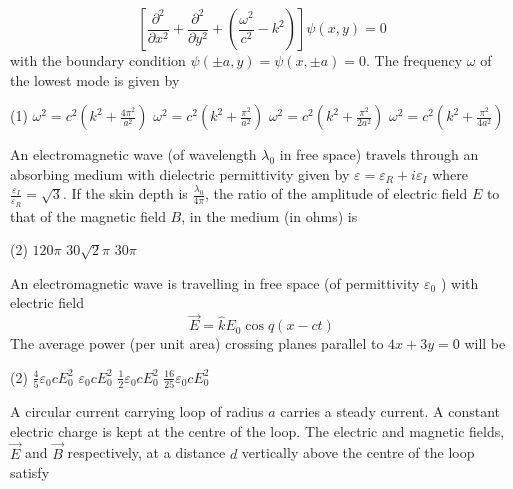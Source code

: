 \begin{enumerate}
\begin{minipage}{\textwidth}
	$$
	\left[\frac{\partial^{2}}{\partial x^{2}}+\frac{\partial^{2}}{\partial y^{2}}+\left(\frac{\omega^{2}}{c^{2}}-k^{2}\right)\right] \psi(x, y)=0
	$$
	with the boundary condition $\psi(\pm a, y)=\psi(x, \pm a)=0$. The frequency $\omega$ of the lowest mode is given by
\end{minipage}
\begin{tasks}(1)
	\task[\textbf{A.}] $\omega^{2}=c^{2}\left(k^{2}+\frac{4 \pi^{2}}{a^{2}}\right)$
	\task[\textbf{B.}]$\omega^{2}=c^{2}\left(k^{2}+\frac{\pi^{2}}{a^{2}}\right)$
	\task[\textbf{C.}]$\omega^{2}=c^{2}\left(k^{2}+\frac{\pi^{2}}{2 a^{2}}\right)$
	\task[\textbf{D.}]$\omega^{2}=c^{2}\left(k^{2}+\frac{\pi^{2}}{4 a^{2}}\right)$
\end{tasks}
\begin{minipage}{\textwidth}
	\item An electromagnetic wave (of wavelength $\lambda_{0}$ in free space) travels through an absorbing medium with dielectric permittivity given by $\varepsilon=\varepsilon_{R}+i \varepsilon_{I}$ where $\frac{\varepsilon_{I}}{\varepsilon_{R}}=\sqrt{3}$. If the skin depth is $\frac{\lambda_{0}}{4 \pi}$, the ratio of the amplitude of electric field $E$ to that of the magnetic field $B$, in the medium (in ohms) is
\end{minipage}
\begin{tasks}(2)
	\task[\textbf{A.}] $120 \pi$
	\task[\textbf{C.}]$30 \sqrt{2} \pi$
	\task[\textbf{D.}] $30 \pi$
\end{tasks}
\begin{minipage}{\textwidth}
	\item An electromagnetic wave is travelling in free space (of permittivity $\varepsilon_{0}$ ) with electric field
	$$
	\vec{E}=\hat{k} E_{0} \cos q(x-c t)
	$$
	The average power (per unit area) crossing planes parallel to $4 x+3 y=0$ will be
\end{minipage}
\begin{tasks}(2)
	\task[\textbf{A.}] $\frac{4}{5} \varepsilon_{0} c E_{0}^{2}$
	\task[\textbf{B.}]$\varepsilon_{0} c E_{0}^{2}$
	\task[\textbf{C.}]$\frac{1}{2} \varepsilon_{0} c E_{0}^{2}$
	\task[\textbf{D.}] $\frac{16}{25} \varepsilon_{0} c E_{0}^{2}$
\end{tasks}
\begin{minipage}{\textwidth}
	\item A circular current carrying loop of radius $a$ carries a steady current. A constant electric charge is kept at the centre of the loop. The electric and magnetic fields, $\vec{E}$ and $\vec{B}$ respectively, at a distance $d$ vertically above the centre of the loop satisfy

\end{minipage}
\end{enumerate}

